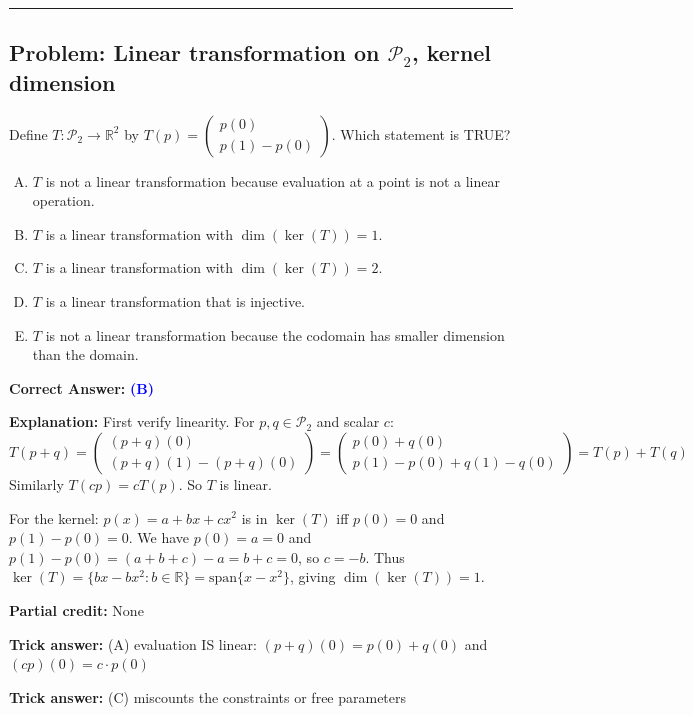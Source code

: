 \documentclass[12pt]{amsart}
\newcommand{\divider}{
  \vspace{-1em}
  \noindent
  \raisebox{-0.15ex}{\textbullet}%
  \hspace{0.5em}%
  \rule[0.5ex]{0.95\textwidth}{1.0pt}%
  \hspace{0.5em}%
  \raisebox{-0.15ex}{\textbullet}%
  \vspace{0em}
}
\begin{document}
\divider

\subsection*{Problem: Linear transformation on $\mathcal{P}_2$, kernel dimension}

Define $T: \mathcal{P}_2 \to \mathbb{R}^2$ by $T(p) = \begin{pmatrix} p(0) \\ p(1) - p(0) \end{pmatrix}$. Which statement is TRUE?

\begin{enumerate}[(A)]
\item $T$ is not a linear transformation because evaluation at a point is not a linear operation.
\item $T$ is a linear transformation with $\dim(\ker(T)) = 1$.
\item $T$ is a linear transformation with $\dim(\ker(T)) = 2$.
\item $T$ is a linear transformation that is injective.
\item $T$ is not a linear transformation because the codomain has smaller dimension than the domain.
\end{enumerate}

\textbf{Correct Answer:} \textcolor{blue}{\textbf{(B)}}

\textbf{Explanation:} First verify linearity. For $p, q \in \mathcal{P}_2$ and scalar $c$:
$$T(p+q) = \begin{pmatrix} (p+q)(0) \\ (p+q)(1) - (p+q)(0) \end{pmatrix} = \begin{pmatrix} p(0)+q(0) \\ p(1)-p(0) + q(1)-q(0) \end{pmatrix} = T(p) + T(q)$$
Similarly $T(cp) = cT(p)$. So $T$ is linear.

For the kernel: $p(x) = a + bx + cx^2$ is in $\ker(T)$ iff $p(0) = 0$ and $p(1) - p(0) = 0$.
We have $p(0) = a = 0$ and $p(1) - p(0) = (a + b + c) - a = b + c = 0$, so $c = -b$.
Thus $\ker(T) = \{bx - bx^2 : b \in \mathbb{R}\} = \text{span}\{x - x^2\}$, giving $\dim(\ker(T)) = 1$.

\textbf{Partial credit:} None

\textbf{Trick answer:} (A) evaluation IS linear: $(p+q)(0) = p(0) + q(0)$ and $(cp)(0) = c \cdot p(0)$

\textbf{Trick answer:} (C) miscounts the constraints or free parameters
\end{document}
